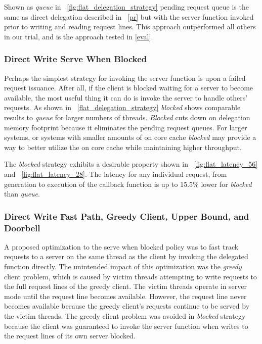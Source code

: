 \documentclass{uicthesi}
\newcounter{problem}
\begin{document}
Shown as \textit{queue} in ~\ref{fig:flat_delegation_strategy} pending request queue is the same as direct delegation described in ~\autoref{pr} but with the server function invoked prior to writing and reading request lines. This approach outperformed all others in our trial, and is the approach tested in \autoref{eval}. 

\subsubsection{Direct Write Serve When Blocked}

Perhaps the simplest strategy for invoking the server function is upon a failed request issuance. After all, if the client is blocked waiting for a server to become available, the most useful thing it can do is invoke the server to handle others' requests. As shown in ~\ref{flat_delegation_strategy} \textit{blocked} shows comparable results to \textit{queue} for larger numbers of threads. \textit{Blocked} cuts down on delegation memory footprint because it eliminates the pending request queues. For larger systems, or systems with smaller amounts of on core cache \textit{blocked} may provide a way to better utilize the on core cache while maintaining higher throughput. 

The \textit{blocked} strategy exhibits a desirable property shown in ~\ref{fig:flat_latency_56} and ~\ref{fig:flat_latency_28}. The latency for any individual request, from generation to execution of the callback function is up to 15.5\% lower for \textit{blocked} than \textit{queue}. 

\subsubsection{Direct Write Fast Path, Greedy Client, Upper Bound, and Doorbell}
A proposed optimization to the serve when blocked policy was to fast track requests to a server on the same thread as the client by invoking the delegated function directly. The unintended impact of this optimization was the \textit{greedy} client problem, which is caused by victim threads attempting to write requests to the full request lines of the greedy client. The victim threads operate in server mode until the request line becomes available. However, the request line never becomes available because the greedy client's requests continue to be served by the victim threads. The greedy client problem was avoided in \textit{blocked} strategy because the client was guaranteed to invoke the server function when writes to the request lines of its own server blocked. 
\end{document}
